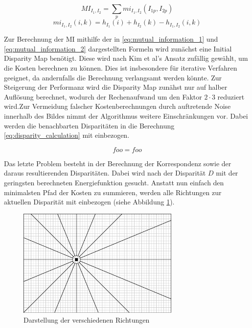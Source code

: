 \begin{equation}\label{eq:mutual_information_1}
MI_{I_1,I_2} = \sum_{p} mi_{I_1,I_2}(I_{1p},I_{2p})
\end{equation}
\begin{equation}\label{eq:mutual_information_2}
mi_{I_1,I_2} (i,k) = h_{I_1}(i)+h_{I_2}(k)-h_{I_1,I_2}(i,k)
\end{equation}

\noindent
Zur Berechnung der MI mithilfe der in \ref{eq:mutual_information_1} und \ref{eq:mutual_information_2} dargestellten Formeln wird zunächst eine Initial Disparity Map benötigt. Diese wird nach Kim et al’s \cite{zureiki2008stereo} Ansatz zufällig gewählt, um die Kosten berechnen zu können. Dies ist insbesondere für iterative Verfahren geeignet, da andernfalls die Berechnung verlangsamt werden könnte. Zur Steigerung der Performanz wird die Disparity Map zunähst nur auf halber Auflösung berechnet,  wodurch der Rechenaufwand um den Faktor $2 \cdot 3$ reduziert wird.Zur Vermeidung falscher Kostenberechnungen durch auftretende Noise innerhalb des Bildes nimmt der Algorithmus weitere Einschränkungen vor. Dabei werden die benachbarten Disparitäten in die Berechnung \ref{eq:disparity_calculation} mit einbezogen.

\begin{equation}\label{eq:disparity_calculation}
 foo = foo
\end{equation}

\noindent
Das letzte Problem besteht in der Berechnung der Korrespondenz sowie der daraus resultierenden Disparitäten. Dabei wird nach der Disparität $D$ mit der geringsten berechneten Energiefunktion gesucht. Anstatt nun einfach den minimalsten Pfad der Kosten zu summieren, werden alle Richtungen zur aktuellen Disparität mit einbezogen (siehe Abbildung \ref{fig:sgm_directions}).

\begin{figure}[h]
	\begin{center}
		\includegraphics[width=8cm]{img/sgm_directions.pdf}
	\end{center}
	\caption{Darstellung der verschiedenen Richtungen}
	\label{fig:sgm_directions}
\end{figure}

